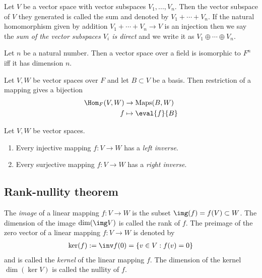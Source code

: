 \documentclass{article}
\begin{document}
\begin{definition}
	Let $V$ be a vector space with vector subspaces $V_1,...,V_n$. Then the vector
	subspace of $V$ they generated is called the sum and denoted by $V_1+\cdots+V_n$.
	If the natural homomorphism given by addition $V_1+\cdots +V_n\to V$ is an
	injection then we say the \emph{sum of the vector subspaces $V_i$ is direct} and
	we write it as $V_1\oplus\cdots\oplus V_n$.
\end{definition}

\begin{theorem}[Theorem 1.7.7]
	Let $n$ be a natural number. Then a vector space over a field is isomorphic
	to $F^n$ iff it has dimension $n$.
\end{theorem}

\begin{lemma}[Lemma 1.7.8]
	Let $V,W$ be vector spaces over $F$ and let $B\subset V$ be a basis. Then
	restriction of a mapping gives a bijection
	\begin{align*}
		\Hom_F(V,W) & \to \text{Maps}(B,W) \\
		f           & \mapsto \eval{f}{B}
	\end{align*}
\end{lemma}

\begin{proposition}[Proposition 1.7.9]
	Let $V,W$ be vector spaces.
	\begin{enumerate}
		\item Every injective mapping $f:V\to W$ has a \emph{left inverse}.
		\item Every surjective mapping $f:V\to W$ has a \emph{right inverse}.
	\end{enumerate}
\end{proposition}

\subsection{Rank-nullity theorem}

\begin{definition}
	The \emph{image} of a linear mapping $f:V\to W$ is the subset $\img(f)=f(V)\subset W$.
	The dimension of the image $\dim(\img V)$ is called the rank of $f$.
	The preimage of the zero vector of a linear mapping $f:V\to W$ is denoted by
	\begin{align*}
		\ker(f):=\inv f(0)=\{v\in V : f(v)=0\}
	\end{align*}
	and is called the \emph{kernel} of the linear mapping $f$. The dimension of the
	kernel $\dim(\ker V)$ is called the nullity of $f$.
\end{definition}
\end{document}
